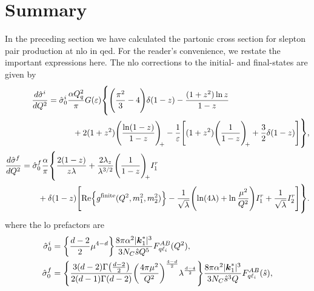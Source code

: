 \section{Summary}

In the preceding section we have calculated the partonic cross section for slepton pair production at \gls{nlo} in \gls{qed}. For the reader's convenience, we restate the important expressions here.
The \gls{nlo} corrections to the initial- and final-states are given by
\begin{subequations}
\label{eq:summary_dsigma_nlo}
\begin{align}
    \begin{split}
        \frac{d\hat\sigma^i}{dQ^2} &= \hat\sigma^i_0 \frac{\alpha Q_q^2}{\pi} G(\eps)
        \vastl\{
            \Biggl(\frac{\pi^2}{3} - 4\Biggr)\delta(1-z)
            - \frac{(1+z^2)\ln z}{1-z}
            \\ &\hspace{3em}
            + 2(1+z^2) \plusdistln
            - \frac{1}{\eps}\Biggl[ (1+z^2)\plusdist + \frac{3}{2}\delta(1-z) \Biggr]
        \vastr\},
    \end{split}
    \label{eq:summary_dsigmai_nlo}
    \\
    \begin{split}
        \frac{d\hat\sigma^f}{dQ^2} &= \hat\sigma^f_0 \frac{\alpha}{\pi} \vastl\{
            \frac{2(1-z)}{z\lambda}
            + \frac{2\lambda_z}{\lambda^{3/2}} \plusdist I^r_1
            \\ &\qquad
            + \delta(1-z) \Biggl[
                \Re\Bigl\{ g^{\mathrm{finite}}(Q^2,m_1^2,m_2^2) \Bigr\}
                - \frac{1}{\sqrt{\lambda}} \Biggl(
                    \ln(4\lambda)
                    + \ln\frac{\mu^2}{Q^2}
                \Biggr) I^r_1
                + \frac{1}{\sqrt{\lambda}} I^r_2
            \Biggr]
        \vastr\}.
    \end{split}
    \label{eq:summary_dsigmaf_nlo}
\end{align}
\end{subequations}
where the \gls{lo} prefactors are
\begin{subequations}
\begin{align}
    \hat{\sigma}^i_{0} &= \biggl\{ \frac{d-2}{2} \mu^{4-d} \biggr\}
    \frac{8\pi\alpha^2 \lvert\boldsymbol{k}_1^*\rvert^3}{3N_C\hat{s} Q^5}F_{q\ell_i}^{AB}(Q^2),
    \label{eq:summary_sigma0i}
    \\
    \hat{\sigma}^f_0 &= \Biggl\{
        \frac{3(d-2)\Gamma\bigl(\frac{d-2}{2}\bigr)}{2(d-1)\Gamma(d-2)}
        \biggl(\frac{4\pi \mu^2}{Q^2}\biggr)^{\frac{4-d}{2}} \lambda^{\frac{d-4}{2}}
    \Biggr\}
    \frac{8\pi\alpha^2 \lvert\boldsymbol{k}_1^*\rvert^3}{3N_C\hat{s}^3 Q}F_{q\ell_i}^{AB}(\hat{s}),
    \label{eq:summary_sigma0f}
\end{align}
\end{subequations}
